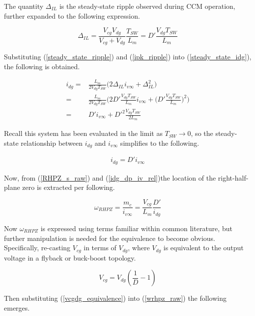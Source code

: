 \documentclass[conference]{IEEEtran}
\begin{document}
The quantity $\Delta_{IL}$ is the steady-state ripple observed during CCM operation, further expanded to the following expression.

\begin{equation}
\Delta_{IL} = \frac{V_{cg}V_{dg}}{V_{cg} + V_{dg}} \frac{T_{SW}}{L_m} =
D'\frac{V_{dg} T_{SW}}{L_m}
\label{steady_state_ripple}
\end{equation}

Substituting (\ref{steady_state_ripple}) and (\ref{ipk_ripple}) into (\ref{steady_state_idg}), the following is obtained.

\begin{align}
i_{dg} =& \frac{L_m}{2V_{dg}T_{SW}} \bigg(2\Delta_{IL} i_{v\infty} + \Delta_{IL}^2 \bigg) \nonumber \\
=& \frac{L_m}{2V_{dg}T_{SW}} \bigg(2 D'\frac{V_{dg} T_{SW}}{L_m} i_{v\infty} + \bigg(D'\frac{V_{dg} T_{SW}}{L_m}\bigg)^2\bigg) \nonumber \\
=&  D' i_{v\infty} + D'^2\frac{V_{dg} T_{SW}}{2L_m}
\end{align}

Recall this system has been evaluated in the limit as $T_{SW} \to 0$, so the steady-state relationship between $i_{dg}$ and $i_{v\infty}$ simplifies to the following.

\begin{align}
i_{dg} = D' i_{v\infty}
\label{idg_dp_iv_rel}
\end{align}

Now, from (\ref{RHPZ_s_raw}) and (\ref{idg_dp_iv_rel})the location of the right-half-plane zero is extracted per following.

\begin{equation}
	\omega_{RHPZ} = \frac{m_c}{i_{v\infty}} = \frac{V_{cg}}{L_m} \frac{D'}{i_{dg}}
	\label{wrhpz_raw}
\end{equation}

Now $\omega_{RHPZ}$ is expressed using terms familiar within common literature, but further manipulation is needed for the equivalence to become obvious.  Specifically, re-casting $V_{cg}$ in terms of $V_{dg}$, where $V_{dg}$ is equivalent to the output voltage in a flyback or buck-boost topology.

\begin{equation}
V_{cg} = V_{dg} (\frac{1}{D} - 1)
\label{vcgdg_equivalence}
\end{equation}

Then substituting (\ref{vcgdg_equivalence}) into (\ref{wrhpz_raw}) the following emerges.
\end{document}
